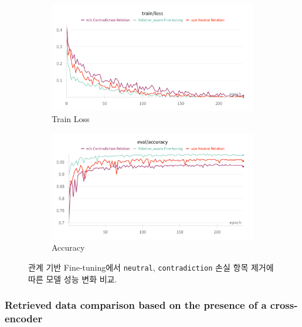 \documentclass[a4paper,fleqn]{cas-sc}
\begin{document}
    \begin{figure}[htbp]
        \centering
        \begin{subfigure}[b]{0.48\textwidth}
            \centering
            \includegraphics[width=\textwidth]{2_train_loss.png}
            \caption{Train Loss}
            \label{fig:neutral_only}
        \end{subfigure}
        \hspace{0.02\textwidth}
        \begin{subfigure}[b]{0.48\textwidth}
            \centering
            \includegraphics[width=\textwidth]{2_accuracy.png}
            \caption{Accuracy}
            \label{fig:both_relations}
        \end{subfigure}
        \caption{관계 기반 Fine-tuning에서 \texttt{neutral}, \texttt{contradiction} 손실 항목 제거에 따른 모델 성능 변화 비교.}
        \label{fig:relation_ablation}
    \end{figure}
  


\subsubsection{Retrieved data comparison based on the presence of a cross-encoder}
\end{document}
